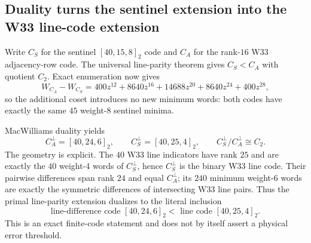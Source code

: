 \subsection{Duality turns the sentinel extension into the W33 line-code extension}
Write $C_S$ for the sentinel $[40,15,8]_2$ code and $C_A$ for the rank-$16$ W33 adjacency-row code.  The universal line-parity theorem gives $C_S<C_A$ with quotient $C_2$.  Exact enumeration now gives
\[
W_{C_A}-W_{C_S}=400z^{12}+8640z^{16}+14688z^{20}+8640z^{24}+400z^{28},
\]
so the additional coset introduces no new minimum words: both codes have exactly the same $45$ weight-$8$ sentinel minima.

MacWilliams duality yields
\[
\boxed{C_A^\perp=[40,24,6]_2,\qquad C_S^\perp=[40,25,4]_2},
\qquad C_S^\perp/C_A^\perp\cong C_2.
\]
The geometry is explicit.  The $40$ W33 line indicators have rank $25$ and are exactly the $40$ weight-$4$ words of $C_S^\perp$, hence $C_S^\perp$ is the binary W33 line code.  Their pairwise differences span rank $24$ and equal $C_A^\perp$; its $240$ minimum weight-$6$ words are exactly the symmetric differences of intersecting W33 line pairs.  Thus the primal line-parity extension dualizes to the literal inclusion
\[
\boxed{\text{line-difference code }[40,24,6]_2<\text{ line code }[40,25,4]_2}.
\]
This is an exact finite-code statement and does not by itself assert a physical error threshold.
